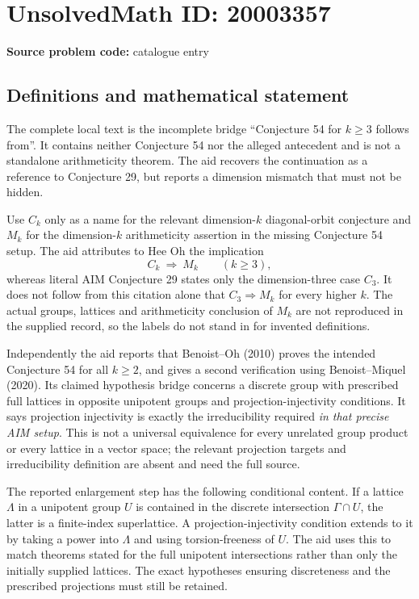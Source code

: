 \documentclass[11pt]{article}
\begin{document}
\section*{UnsolvedMath ID: 20003357}
\textbf{Source problem code:} catalogue entry
\subsection{Definitions and mathematical statement}
The complete local text is the incomplete bridge ``Conjecture 54 for $k\geq3$ follows from''. It contains neither Conjecture 54 nor the alleged antecedent and is not a standalone arithmeticity theorem. The aid recovers the continuation as a reference to Conjecture 29, but reports a dimension mismatch that must not be hidden.

Use $C_k$ only as a name for the relevant dimension-$k$ diagonal-orbit conjecture and $M_k$ for the dimension-$k$ arithmeticity assertion in the missing Conjecture 54 setup. The aid attributes to Hee Oh the implication
\[
 C_k\ \Longrightarrow\ M_k\qquad(k\geq3),
\]
whereas literal AIM Conjecture 29 states only the dimension-three case $C_3$. It does not follow from this citation alone that $C_3\Rightarrow M_k$ for every higher $k$. The actual groups, lattices and arithmeticity conclusion of $M_k$ are not reproduced in the supplied record, so the labels do not stand in for invented definitions.

Independently the aid reports that Benoist--Oh (2010) proves the intended Conjecture 54 for all $k\geq2$, and gives a second verification using Benoist--Miquel (2020). Its claimed hypothesis bridge concerns a discrete group with prescribed full lattices in opposite unipotent groups and projection-injectivity conditions. It says projection injectivity is exactly the irreducibility required \emph{in that precise AIM setup}. This is not a universal equivalence for every unrelated group product or every lattice in a vector space; the relevant projection targets and irreducibility definition are absent and need the full source.

The reported enlargement step has the following conditional content. If a lattice $\Lambda$ in a unipotent group $U$ is contained in the discrete intersection $\Gamma\cap U$, the latter is a finite-index superlattice. A projection-injectivity condition extends to it by taking a power into $\Lambda$ and using torsion-freeness of $U$. The aid uses this to match theorems stated for the full unipotent intersections rather than only the initially supplied lattices. The exact hypotheses ensuring discreteness and the prescribed projections must still be retained.
\end{document}
